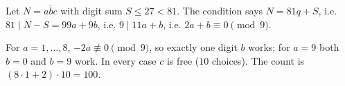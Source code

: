 Let $N=\overline{abc}$ with digit sum $S\le27<81$. The condition says $N=81q+S$, i.e. $81\mid N-S=99a+9b$, i.e. $9\mid11a+b$, i.e. $2a+b\equiv0\pmod9$.

For $a=1,\dots,8$, $-2a\not\equiv0\pmod9$, so exactly one digit $b$ works; for $a=9$ both $b=0$ and $b=9$ work. In every case $c$ is free ($10$ choices). The count is $(8\cdot1+2)\cdot10=\boxed{100}$.
